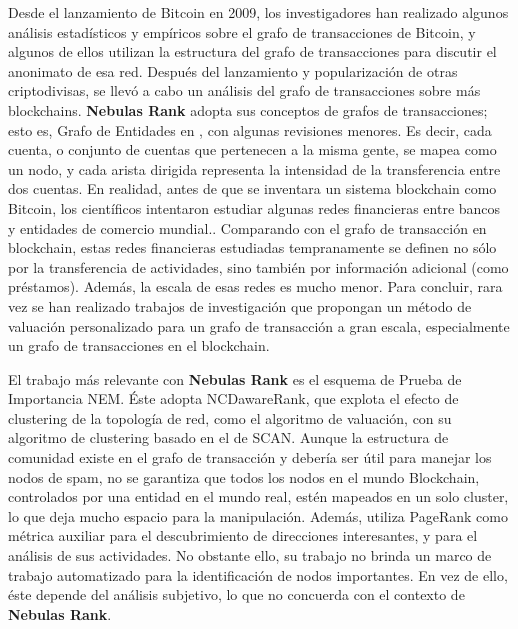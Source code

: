 Desde el lanzamiento de Bitcoin\cite{Nakamoto2008} en 2009, los investigadores han realizado algunos análisis estadísticos y empíricos sobre el grafo de transacciones de Bitcoin\cite{Ron}\cite{Haslhofer}\cite{NielKondor2014}\cite{Baumann2014}, y algunos de ellos utilizan la estructura del grafo de transacciones para discutir el anonimato de esa red\cite{Meiklejohn2013}\cite{Ober2013}\cite{pham2016anomaly}\cite{Fleder2015}\cite{Ferrin2015}. Después del lanzamiento y popularización de otras criptodivisas, se llevó a cabo un análisis del grafo de transacciones sobre más blockchains\cite{Chang2017}\cite{Anderson2016}. \textbf{Nebulas Rank} adopta sus conceptos de grafos de transacciones; esto es, Grafo de Entidades en \cite{Tschorsch2015}, con algunas revisiones menores. Es decir, cada cuenta, o conjunto de cuentas que pertenecen a la misma gente, se mapea como un nodo, y cada arista dirigida representa la intensidad de la transferencia entre dos cuentas. En realidad, antes de que se inventara un sistema blockchain como Bitcoin, los científicos intentaron estudiar algunas redes financieras entre bancos y entidades de comercio mundial.\cite{propper2008towards}\cite{Boss2004}\cite{Serrano2007}\cite{Bech2008}\cite{Fagiolo2009}\cite{Morten2006}\cite{Boss2004a}\cite{Krempel2002}\cite{Serrano2003}. Comparando con el grafo de transacción en blockchain, estas redes financieras estudiadas tempranamente se definen no sólo por la transferencia de actividades, sino también por información adicional (como préstamos). Además, la escala de esas redes es mucho menor. Para concluir, rara vez se han realizado trabajos de investigación que propongan un método de valuación personalizado para un grafo de transacción a gran escala, especialmente un grafo de transacciones en el blockchain.

El trabajo más relevante con \textbf{Nebulas Rank} es el esquema de Prueba de Importancia NEM\cite{nem}. Éste adopta NCDawareRank\cite{Nikolakopoulos2013}, que explota el efecto de clustering de la topología de red, como el algoritmo de valuación, con su algoritmo de clustering basado en el de SCAN\cite{xu2007scan}\cite{shiokawa2015scan}\cite{chang2017mathsf}. Aunque la estructura de comunidad existe en el grafo de transacción y debería ser útil para manejar los nodos de spam, no se garantiza que todos los nodos en el mundo Blockchain, controlados por una entidad en el mundo real, estén mapeados en un solo cluster, lo que deja mucho espacio para la manipulación. Además, \cite{Fleder2015} utiliza PageRank\cite{Brin2010}\cite{page1999pagerank} como métrica auxiliar para el descubrimiento de direcciones interesantes, y para el análisis de sus actividades. No obstante ello, su trabajo no brinda un marco de trabajo automatizado para la identificación de nodos importantes. En vez de ello, éste depende del análisis subjetivo, lo que no concuerda con el contexto de \textbf{Nebulas Rank}.

